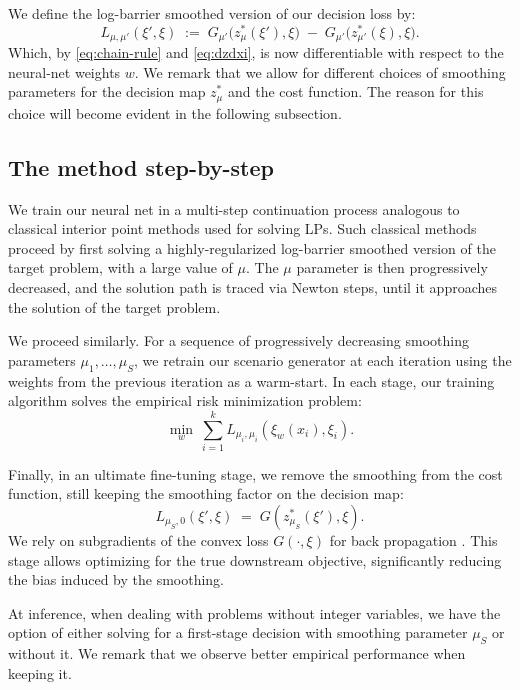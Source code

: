 \documentclass{article}
\theoremstyle{plain}
\theoremstyle{definition}
\theoremstyle{remark}
\begin{document}
We define the log-barrier smoothed version of our decision loss by:
\begin{equation}
\label{eq:Lmu-muprime}
L_{\mu,\mu'}(\xi',\xi)
\;:=\;
G_{\mu'}\!\big(z_\mu^*(\xi'),\xi\big)
\;-\;
G_{\mu'}\!\big(z_{\mu'}^*(\xi),\xi\big).
\end{equation}
Which, by \eqref{eq:chain-rule} and \eqref{eq:dzdxi}, is now differentiable with respect to the neural-net weights $w$. We remark that we allow for different choices of smoothing parameters for the decision map $z^*_\mu$ and the cost function. The reason for this choice will become evident in the following subsection.

\subsection{The method step-by-step}
\label{sec:method}
We train our neural net in a multi-step continuation process analogous to classical interior point methods used for solving LPs. Such classical methods proceed by first solving a highly-regularized log-barrier smoothed version of the target problem, with a large value of $\mu$. The $\mu$ parameter is then progressively decreased, and the solution path is traced via Newton steps, until it approaches the solution of the target problem.

We proceed similarly. For a sequence of progressively decreasing smoothing parameters $\mu_1,\ldots,\mu_S$, we retrain our scenario generator at each iteration using the weights from the previous iteration as a warm-start. In each stage, our training algorithm solves the empirical risk minimization problem:
\begin{equation}
\label{eq:stagewise-erm}
\min_{w}\ \sum_{i=1}^k L_{\mu_i,\mu_i}(\xi_w(x_i),\xi_i).
\end{equation}

Finally, in an ultimate fine-tuning stage, we remove the smoothing from the cost function, still keeping the smoothing factor on the decision map:
\begin{equation}
\label{eq:finetune}
L_{\mu_S,0}(\xi',\xi) \;=\; G\!\left(z^*_{\mu_S}(\xi'), \xi\right).
\end{equation}
We rely on subgradients of the convex loss $G(\cdot,\xi)$ for back propagation \cite{placeholder-subgradients}. This stage allows optimizing for the true downstream objective, significantly reducing the bias induced by the smoothing.

At inference, when dealing with problems without integer variables, we have the option of either solving for a first-stage decision with smoothing parameter $\mu_S$ or without it. We remark that we observe better empirical performance when keeping it.
\end{document}
